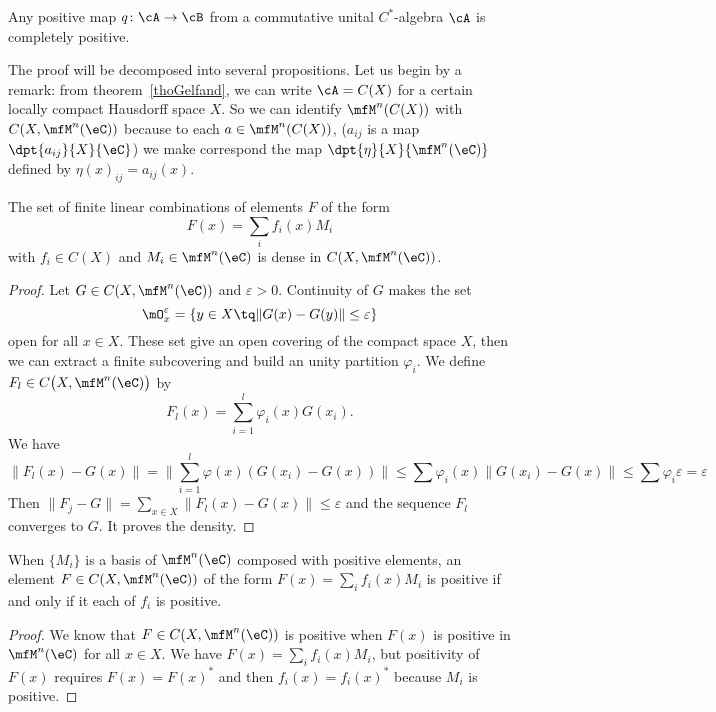 \begin{proposition}
Any positive map $q\colon \cA\to \cB$ from a commutative unital $C^*$-algebra $\cA$ is completely positive.
\end{proposition}

The proof will be decomposed into several propositions. Let us begin by a remark: from theorem~\ref{thoGelfand}, we can write $\cA=C(X)$ for a certain locally compact Hausdorff space $X$. So we can identify $\mfM^n(C(X))$ with $C(X,\mfM^n(\eC))$ because to each $a\in\mfM^n(C(X))$, ($a_{ij}$ is a map $\dpt{ a_{ij} }{ X }{ \eC }$) we make correspond the map $\dpt{ \eta }{ X }{ \mfM^n(\eC) }$ defined by $\eta(x)_{ij}=a_{ij}(x)$.


\begin{proposition}
The set of finite linear combinations of elements $F$ of the form
\[
  F(x)=\sum_i f_i(x)M_i
\]
with $f_i\in C(X)$ and $M_i\in\mfM^n(\eC)$ is dense in $C(X,\mfM^n(\eC))$.
 \label{prop:lencombpart}
\end{proposition}


\begin{proof}
Let $G\in C(X,\mfM^n(\eC))$ and $\varepsilon>0$. Continuity of $G$ makes the set
\[
  \mO_x^{\varepsilon}=\{ y\in X\tq \| G(x)-G(y) \|\leq\varepsilon \}
\]
open for all $x\in X$. These set give an open covering of the compact space $X$, then we can extract a finite subcovering and build an unity partition $\varphi_i$. We define $F_l\in C\big( X,\mfM^n(\eC) \big)$ by
\begin{equation} \label{eq:Fllim}
  F_l(x)=\sum_{i=1}^l\varphi_i(x)G(x_i).
\end{equation}
We have
\begin{equation}
\| F_l(x)-G(x) \|=\| \sum_{i=1}^l\varphi(x)( G(x_i)-G(x) ) \|
        \leq \sum \varphi_i(x)\| G(x_i)-G(x) \|
        \leq \sum\varphi_i\varepsilon
    =\varepsilon
\end{equation}
Then $\| F_j-G \|=\sum_{x\in X}\| F_l(x)-G(x) \|\leq\varepsilon$ and the sequence $F_l$ converges to $G$. It proves the density.
\end{proof}


\begin{proposition}
When $\{ M_i \}$ is a basis of $\mfM^n(\eC)$ composed with positive elements, an element $F\in C(X,\mfM^n(\eC))$ of the form $F(x)=\sum_if_i(x)M_i$ is positive if and only if it each of $f_i$ is positive.
\end{proposition}

\begin{proof}
We know that $F\in C(X,\mfM^n(\eC))$ is positive when $F(x)$ is positive in $\mfM^n(\eC)$ for all $x\in X$. We have $F(x)=\sum_if_i(x)M_i$, but positivity of $F(x)$ requires $F(x)=F(x)^*$ and then $f_i(x)=f_i(x)^*$ because $M_i$ is positive.

\end{proof}

